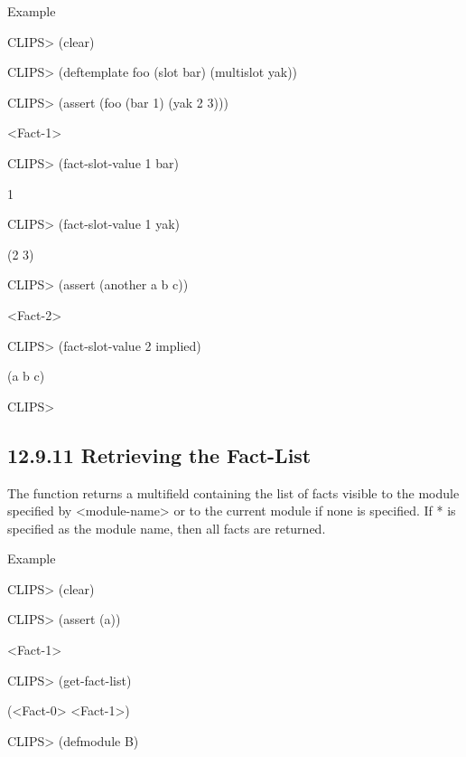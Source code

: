 \documentclass[letterpaper,10pt,english]{sphinxmanual}
\begin{document}
Example

CLIPS\textgreater{} (clear)

CLIPS\textgreater{} (deftemplate foo (slot bar) (multislot yak))

CLIPS\textgreater{} (assert (foo (bar 1) (yak 2 3)))

\textless{}Fact-1\textgreater{}

CLIPS\textgreater{} (fact-slot-value 1 bar)

1

CLIPS\textgreater{} (fact-slot-value 1 yak)

(2 3)

CLIPS\textgreater{} (assert (another a b c))

\textless{}Fact-2\textgreater{}

CLIPS\textgreater{} (fact-slot-value 2 implied)

(a b c)

CLIPS\textgreater{}


\subsection{12.9.11 Retrieving the Fact-List}
\label{\detokenize{actions:retrieving-the-fact-list}}
The  function returns a multifield containing the list
of facts visible to the module specified by \textless{}module-name\textgreater{} or to the
current module if none is specified. If * is specified as the module
name, then all facts are returned.


\begin{sphinxVerbatim}[commandchars=\\\{\}]
 \PYG{p}{[}\PYG{p}{]}
\end{sphinxVerbatim}

Example

CLIPS\textgreater{} (clear)

CLIPS\textgreater{} (assert (a))

\textless{}Fact-1\textgreater{}

CLIPS\textgreater{} (get-fact-list)

(\textless{}Fact-0\textgreater{} \textless{}Fact-1\textgreater{})

CLIPS\textgreater{} (defmodule B)
\end{document}
